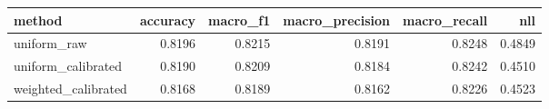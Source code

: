 \begin{tabular}{lrrrrr}
\toprule
method & accuracy & macro\_f1 & macro\_precision & macro\_recall & nll \\
\midrule
uniform\_raw & 0.8196 & 0.8215 & 0.8191 & 0.8248 & 0.4849 \\
uniform\_calibrated & 0.8190 & 0.8209 & 0.8184 & 0.8242 & 0.4510 \\
weighted\_calibrated & 0.8168 & 0.8189 & 0.8162 & 0.8226 & 0.4523 \\
\bottomrule
\end{tabular}
